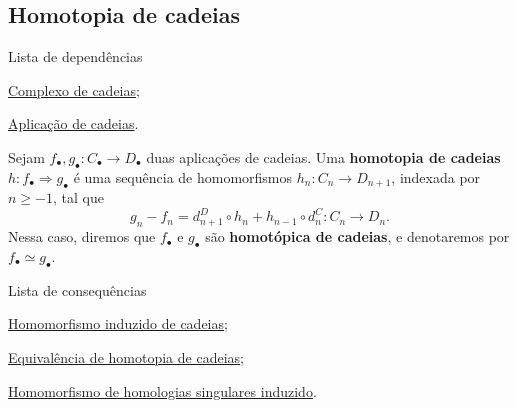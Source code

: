 \subsection{Homotopia de cadeias}
\label{homotopia-de-cadeias-def}
\begin{titlemize}{Lista de dependências}
	\item \hyperref[complexo-de-cadeias-def]{Complexo de cadeias};\\ %
    \item \hyperref[aplicacao-de-cadeias-def]{Aplicação de cadeias}.
\end{titlemize}

\begin{defi}
    Sejam $f_\bullet, g_\bullet:C_\bullet\rightarrow D_\bullet$ duas aplicações de cadeias. Uma \textbf{homotopia de cadeias} $h:f_\bullet\Rightarrow g_\bullet$ é uma sequência de homomorfismos $h_n:C_n\rightarrow D_{n+1}$, indexada por $n\ge -1$, tal que 
    \[g_n-f_n=d_{n+1}^D\circ h_n+ h_{n-1}\circ d_n^C:C_n\rightarrow D_n.\]
    Nessa caso, diremos que $f_\bullet$ e $g_\bullet$ são \textbf{homotópica de cadeias}, e denotaremos por $f_\bullet\simeq g_\bullet$.
\end{defi}

\begin{titlemize}{Lista de consequências}
    \item \hyperref[homomorfismo-induzido-de-cadeias-prop]{Homomorfismo induzido de cadeias};\\
    \item \hyperref[equivalencia-de-homotopia-de-cadeias-def]{Equivalência de homotopia de cadeias};\\
    \item \hyperref[homomorfismo-de-homologias-singulares-induzido-prop]{Homomorfismo de homologias singulares induzido}.\\
\end{titlemize}
